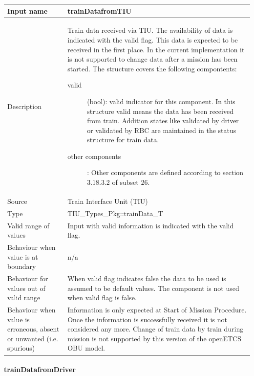 \begin{longtable}{p{}p{}}
\toprule
Input name				& trainDatafromTIU \\
\midrule
Description				& Train data received via TIU. The availability of data is indicated with the valid flag. This data is expected to be received in the first place. In the current implementation it is not supported to change data after a mission has been started.  The structure covers the following compontents:
\begin{description}
\item[valid](bool): valid indicator for this component. In this structure valid means the data has been received from train. Addition states like validated by driver or validated by RBC are maintained in the status structure for train data.
\item[other components]:  Other components are defined according to section 3.18.3.2 of subset 26. 
\end{description} \\
\midrule
Source					& Train Interface Unit (TIU) \\ 
\midrule
Type					& TIU\_Types\_Pkg::trainData\_T \\
\midrule
Valid range of values	& Input with valid information is indicated with the valid flag. 
\\
\midrule
Behaviour when value is at boundary	& n/a\\
\midrule
Behaviour for values out of valid range	& When valid flag indicates false the data to be used is assumed to be default values. The component is not used when valid flag is false.\\
\midrule
Behaviour when value is erroneous, absent or unwanted (i.e. spurious) & Information is only expected at Start of Mission Procedure. Once the information is successfully received it is not considered any more. Change of train data by train during mission is not supported by this version of the openETCS OBU model.\\
\bottomrule
\end{longtable}

\paragraph{trainDatafromDriver}


